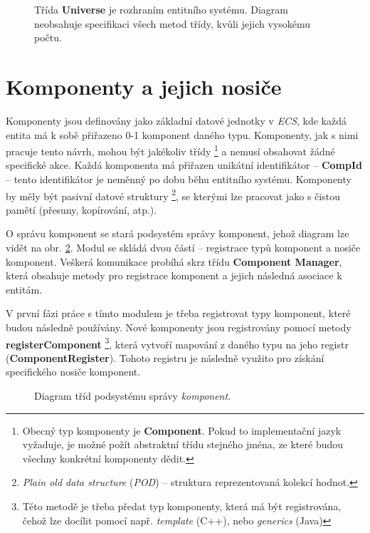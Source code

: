 \begin{figure}[H]
	\caption{Třída \textbf{Universe} je rozhraním entitního systému. Diagram neobsahuje specifikaci všech metod třídy, kvůli jejich vysokému počtu.}
	\label{Fig:DESUniverse}
\end{figure}

\section{Komponenty a jejich nosiče}

Komponenty jsou definovány jako základní datové jednotky v \emph{ECS}, kde každá entita má k sobě přiřazeno 0-1 komponent daného typu. Komponenty, jak s nimi pracuje tento návrh, mohou být jakékoliv třídy \footnote{Obecný typ komponenty je \textbf{Component}. Pokud to implementační jazyk vyžaduje, je možné požít abstraktní třídu stejného jména, ze které budou všechny konkrétní komponenty dědit.} a nemusí obsahovat žádné specifické akce. Každá komponenta má přiřazen unikátní identifikátor -- \textbf{CompId} -- tento identifikátor je neměnný po dobu běhu entitního systému. Komponenty by měly být pasivní datové struktury \footnote{\emph{Plain old data structure} (\emph{POD}) -- struktura reprezentovaná kolekcí hodnot.}, se kterými lze pracovat jako s čistou pamětí (přesuny, kopírování, atp.).

O správu komponent se stará podsystém správy komponent, jehož diagram lze vidět na obr. \ref{Fig:DESCompDiag}. Modul se skládá dvou částí -- registrace typů komponent a nosiče komponent. Veškerá komunikace probíhá skrz třídu \textbf{Component Manager}, která obsahuje metody pro registrace komponent a jejich následná asociace k entitám. 

V první fázi práce s tímto modulem je třeba registrovat typy komponent, které budou následně používány. Nové komponenty jsou registrovány pomocí metody \textbf{registerComponent} \footnote{Této metodě je třeba předat typ komponenty, která má být registrována, čehož lze docílit pomocí např. \emph{template} (C++), nebo \emph{generics} (Java)}, která vytvoří mapování z daného typu na jeho registr (\textbf{ComponentRegister}). Tohoto registru je následně využito pro získání specifického nosiče komponent.

\begin{figure}[H]
	\caption{Diagram tříd podsystému správy \emph{komponent}.}
	\label{Fig:DESCompDiag}
\end{figure}

